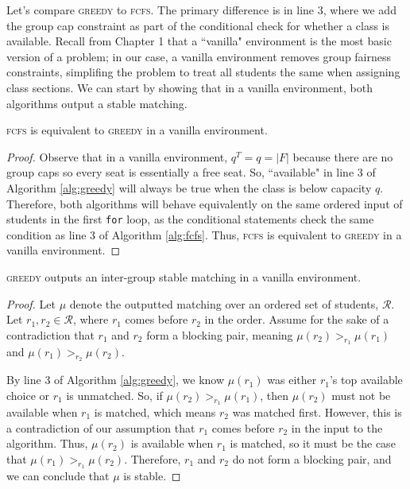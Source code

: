 Let's compare \textsc{greedy} to \textsc{fcfs}. The primary difference is in
line 3, where we add the group cap constraint as part of the conditional check
for whether a class is available. Recall from Chapter 1 that a ``vanilla"
environment is the most basic version of a problem; in our case, a vanilla
environment removes group fairness constraints, simplifing the problem to
treat all students the same when assigning class sections. We can start by showing that in a
vanilla environment, both algorithms output a stable matching. 

\begin{lemma}
  \label{thm:fcfs-greedy}
  \textsc{fcfs} is equivalent to \textsc{greedy} in a vanilla environment.
\end{lemma}

\begin{proof}
  Observe that in a vanilla environment, $q^T = q = |F|$ because there are
  no group caps so every seat is essentially a free seat. So, ``available" in
  line 3 of Algorithm \ref{alg:greedy} will always be true when the class is
  below capacity $q$. Therefore,
  both algorithms will behave equivalently on the same ordered input of students
  in the first \texttt{for} loop, as the conditional statements check the same condition
  as line 3 of Algorithm \ref{alg:fcfs}. Thus, \textsc{fcfs} is equivalent to
  \textsc{greedy} in a vanilla environment.
\end{proof}

\begin{lemma}
  \label{thm:greedyvanilla}
  \textsc{greedy} outputs an inter-group stable matching in a vanilla environment.
\end{lemma}

\begin{proof}
  Let $\mu$ denote the outputted matching over an ordered set of
  students, $\mathcal{R}$. Let $r_1, r_2 \in \mathcal{R}$, where $r_1$ comes
  before $r_2$ in the order.
  Assume for the sake of a contradiction that $r_1$ and $r_2$ form a blocking
  pair, meaning $\mu(r_2) >_{r_1} \mu(r_1)$ and $\mu(r_1) >_{r_2} \mu(r_2)$.

  By line 3 of Algorithm \ref{alg:greedy}, we know $\mu(r_1)$ was either $r_1$'s top
  available choice or $r_1$ is unmatched. So, if $\mu(r_2) >_{r_1} \mu(r_1)$, then
  $\mu(r_2)$ must not be available when $r_1$ is matched, which means $r_2$ was
  matched first. However, this is a contradiction of our assumption that $r_1$
  comes before $r_2$ in the input to the algorithm. Thus, $\mu(r_2)$ is available
  when $r_1$ is matched, so it must be the case that $\mu(r_1) >_{r_1} \mu(r_2)$.
  Therefore, $r_1$ and $r_2$ do not form a blocking pair, and we can conclude that
  $\mu$ is stable.
\end{proof}

